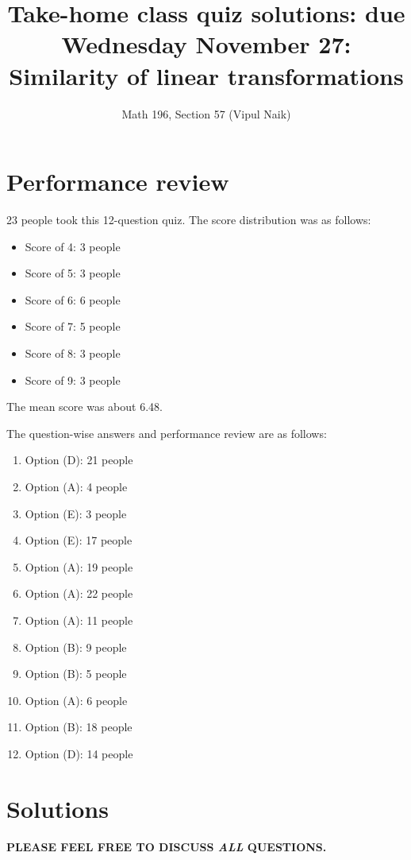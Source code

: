 \documentclass[10pt]{amsart}
\title{Take-home class quiz solutions: due Wednesday November 27: Similarity of linear transformations}
\author{Math 196, Section 57 (Vipul Naik)}
\begin{document}
\maketitle

\section{Performance review}

23 people took this 12-question quiz. The score distribution was as follows:

\begin{itemize}
\item Score of 4: 3 people
\item Score of 5: 3 people
\item Score of 6: 6 people
\item Score of 7: 5 people
\item Score of 8: 3 people
\item Score of 9: 3 people
\end{itemize}

The mean score was about 6.48.

The question-wise answers and performance review are as follows:

\begin{enumerate}
\item Option (D): 21 people%
\item Option (A): 4 people%
\item Option (E): 3 people%
\item Option (E): 17 people
\item Option (A): 19 people
\item Option (A): 22 people
\item Option (A): 11 people%
\item Option (B): 9 people%
\item Option (B): 5 people%
\item Option (A): 6 people%
\item Option (B): 18 people%
\item Option (D): 14 people%
\end{enumerate}

\section{Solutions}

{\bf PLEASE FEEL FREE TO DISCUSS {\em ALL} QUESTIONS.}
\end{document}
